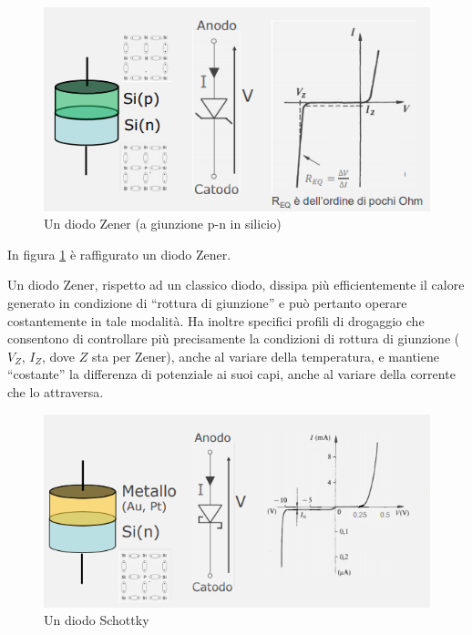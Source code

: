 \documentclass{article}
\begin{document}
\begin{figure}[h]
  \centering
  \includegraphics[scale=0.7]{IM_diodo_Zener}
  \caption{Un diodo Zener (a giunzione p-n in silicio)}
  \label{Schema_diodo_Zener}
\end{figure}

In figura \ref{Schema_diodo_Zener} è raffigurato un diodo Zener.

Un diodo Zener, rispetto ad un classico diodo, dissipa più efficientemente il calore generato in condizione di “rottura di giunzione” e può pertanto operare costantemente in tale modalità. Ha inoltre specifici profili di drogaggio che consentono di controllare più precisamente la condizioni di rottura di giunzione ($V_Z$, $I_Z$, dove $Z$ sta per Zener), anche al variare della temperatura, e mantiene “costante” la differenza di potenziale ai suoi capi, anche al variare della corrente che lo attraversa.

\begin{figure}[h]
  \centering
  \includegraphics[scale=0.7]{IM_diodo_Schottky}
  \caption{Un diodo Schottky}
  \label{Schema_diodo_Schottky}
\end{figure}
\end{document}
